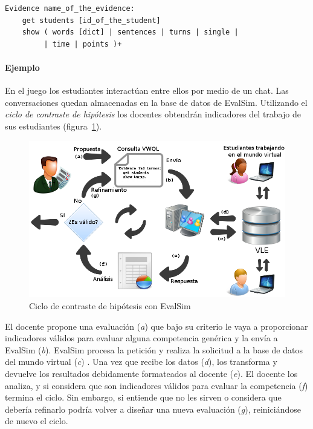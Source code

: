 \begin{verbatim}
Evidence name_of_the_evidence:
    get students [id_of_the_student]
    show ( words [dict] | sentences | turns | single |
         | time | points )+
\end{verbatim}

			\paragraph{Ejemplo}

			En el juego los estudiantes interactúan entre ellos por medio de un chat. Las conversaciones quedan almacenadas en la base de datos de EvalSim. Utilizando el \emph{ciclo de contraste de hipótesis} los docentes obtendrán indicadores del trabajo de sus estudiantes (figura~\ref{fig:EvsDiagram}).

\begin{figure}
  \begin{center}
    \includegraphics[scale=0.4]{EvsDiagram.png}
  \end{center}
  \caption{Ciclo de contraste de hipótesis con EvalSim}
  \label{fig:EvsDiagram}
\end{figure}

			El docente propone una evaluación (\emph{a}) que bajo su criterio le vaya a proporcionar indicadores válidos para evaluar alguna competencia genérica y la envía a EvalSim (\emph{b}). EvalSim procesa la petición y realiza la solicitud a la base de datos del mundo virtual (\emph{c}) . Una vez que recibe los datos (\emph{d}), los transforma y devuelve los resultados debidamente formateados al docente (\emph{e}). El docente los analiza, y si considera que son indicadores válidos para evaluar la competencia (\emph{f}) termina el ciclo. Sin embargo, si entiende que no les sirven o considera que debería refinarlo podría volver a diseñar una nueva evaluación (\emph{g}), reiniciándose de nuevo el ciclo.


